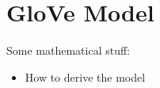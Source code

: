 \chapter{GloVe Model}\label{ch:glove}

Some mathematical stuff:

\begin{itemize}
  \item How to derive the model
\end{itemize}
